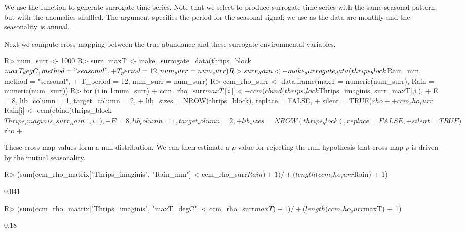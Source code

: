 \documentclass[article]{jss}
\begin{document}
We use the  function to generate surrogate time series. Note that we select  to produce surrogate time series with the same seasonal pattern, but with the anomalies shuffled. The  argument specifies the period for the seasonal signal; we use  as the data are monthly and the seasonality is annual.

Next we compute cross mapping between the true abundance and these surrogate environmental variables.

\begin{Schunk}
\begin{Sinput}
R> num_surr <- 1000
R> surr_maxT <- make_surrogate_data(thrips_block$maxT_degC, method = "seasonal",
+                                   T_period = 12, num_surr = num_surr)
R> surr_Rain <- make_surrogate_data(thrips_block$Rain_mm, method = "seasonal",
+                                   T_period = 12, num_surr = num_surr)
R> ccm_rho_surr <- data.frame(maxT = numeric(num_surr), Rain = numeric(num_surr))
R> for (i in 1:num_surr) {
+      ccm_rho_surr$maxT[i] <- ccm(cbind(thrips_block$Thrips_imaginis, surr_maxT[,i]),
+                              E = 8, lib_column = 1, target_column = 2,
+                              lib_sizes = NROW(thrips_block), replace = FALSE, 
+                              silent = TRUE)$rho
+      
+      ccm_rho_surr$Rain[i] <- ccm(cbind(thrips_block$Thrips_imaginis, surr_Rain[,i]),
+                              E = 8, lib_column = 1, target_column = 2,
+                              lib_sizes = NROW(thrips_block), replace = FALSE, 
+                              silent = TRUE)$rho
+  }
\end{Sinput}
\end{Schunk}

These cross map values form a null distribution. We can then estimate a $p$ value for rejecting the null hypothesis that cross map $\rho$ is driven by the mutual seasonality.

\begin{Schunk}
\begin{Sinput}
R> (sum(ccm_rho_matrix["Thrips_imaginis", "Rain_mm"] < ccm_rho_surr$Rain) + 1) /
+      (length(ccm_rho_surr$Rain) + 1)
\end{Sinput}
\begin{Soutput}
[1] 0.041
\end{Soutput}
\begin{Sinput}
R> (sum(ccm_rho_matrix["Thrips_imaginis", "maxT_degC"] < ccm_rho_surr$maxT) + 1) /
+      (length(ccm_rho_surr$maxT) + 1)
\end{Sinput}
\begin{Soutput}
[1] 0.18
\end{Soutput}
\end{Schunk}
\end{document}
